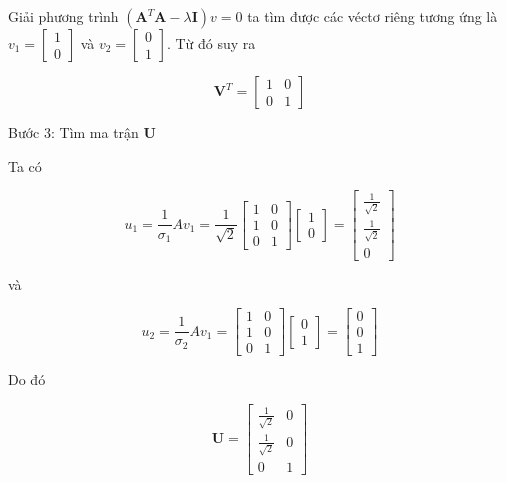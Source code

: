 \documentclass[12pt,a4paper,oneside]{report}
\numberwithin{equation}{section}
\begin{document}
Giải phương trình $\left(\mathbf{A}^{T} \mathbf{A}-\lambda \mathbf{I}\right) v=0$ ta tìm được các véctơ riêng tương ứng là $v_{1}=\left[\begin{array}{l}1 \\ 0\end{array}\right]$ và $v_{2}=\left[\begin{array}{l}0 \\ 1\end{array}\right]$. Từ đó suy ra

$$
\mathbf{V}^{T}=\left[\begin{array}{ll}
	1 & 0 \\
	0 & 1
\end{array}\right]
$$

Bước 3: Tìm ma trận $\mathbf{U}$

Ta có

$$
u_{1}=\frac{1}{\sigma_{1}} A v_{1}=\frac{1}{\sqrt{2}}\left[\begin{array}{ll}
	1 & 0 \\
	1 & 0 \\
	0 & 1
\end{array}\right]\left[\begin{array}{l}
	1 \\
	0
\end{array}\right]=\left[\begin{array}{c}
	\frac{1}{\sqrt{2}} \\
	\frac{1}{\sqrt{2}} \\
	0
\end{array}\right]
$$

và

$$
u_{2}=\frac{1}{\sigma_{2}} A v_{1}=\left[\begin{array}{ll}
	1 & 0 \\
	1 & 0 \\
	0 & 1
\end{array}\right]\left[\begin{array}{l}
	0 \\
	1
\end{array}\right]=\left[\begin{array}{l}
	0 \\
	0 \\
	1
\end{array}\right]
$$

Do đó

$$
\mathbf{U}=\left[\begin{array}{cc}
	\frac{1}{\sqrt{2}} & 0 \\
	\frac{1}{\sqrt{2}} & 0 \\
	0 & 1
\end{array}\right]
$$
\end{document}
